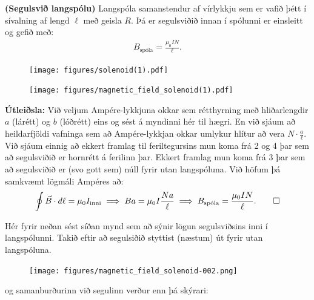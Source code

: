 \begin{tcolorbox}
\begin{theorem}
\textbf{(Segulsvið langspólu)} Langspóla samanstendur af vírlykkju sem er vafið þétt í sívalning af lengd $\ell$ með geisla $R$. Þá er segulsviðið innan í spólunni er einsleitt og gefið með:
\begin{align*}
    B_{\text{spóla}} = \frac{\mu_0 I N}{\ell}.
\end{align*}
\end{theorem}
\begin{figure}[H]
    \centering
    \texttt{[image: figures/solenoid(1).pdf]}
\end{figure}
\end{tcolorbox}


\begin{minipage}{\linewidth}

\begin{figure}
\vspace{-0.5cm}
\texttt{[image: figures/magnetic\_field\_solenoid(1).pdf]}
\end{figure}

\textbf{Útleiðsla:} Við veljum Ampére-lykkjuna okkar sem rétthyrning með hliðarlengdir $a$ (lárétt) og $b$ (lóðrétt) eins og sést á myndinni hér til hægri. En við sjáum að heildarfjöldi vafninga sem að Ampére-lykkjan okkar umlykur hlítur að vera $N \cdot \frac{a}{\ell}$. Við sjáum einnig að ekkert framlag til feriltegursins mun koma frá 2 og 4 þar sem að segulsviðið er hornrétt á ferilinn þar. Ekkert framlag mun koma frá 3 þar sem að segulsviðið er (svo gott sem) núll fyrir utan langspóluna. Við höfum þá samkvæmt lögmáli Ampéres að:
\begin{align*}
    \oint \vec{B} \cdot d\ell = \mu_0 I_{\text{inni}} \implies B a = \mu_0 I \frac{Na}{\ell} \implies B_{\text{spóla}} = \frac{\mu_0 I N}{\ell}.\qed
\end{align*}
\end{minipage}

\vspace{0.2cm}

Hér fyrir neðan sést síðan mynd sem að sýnir lögun segulsviðsins inni í langspólunni. Takið eftir að segulsiðið styttist (næstum) út fyrir utan langspóluna.

\begin{figure}[H]
    \centering
    \texttt{[image: figures/magnetic\_field\_solenoid-002.png]}
\end{figure}

og samanburðurinn við segulinn verður enn þá skýrari:

